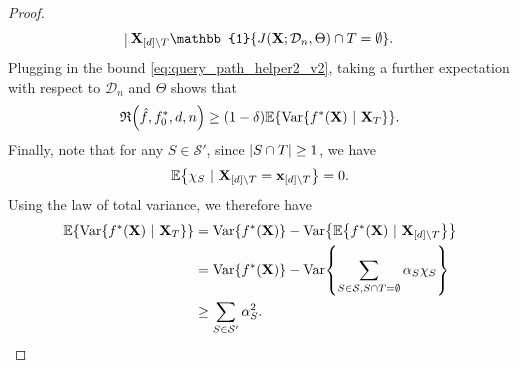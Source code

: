 \documentclass[11pt]{article}
\newcommand{\bx}{\mathbf{x}}
\newcommand{\bX}{\mathbf{X}}
\DeclarePairedDelimiter{\braces}{\lbrace}{\rbrace}
\DeclarePairedDelimiter{\paren}{(}{)}
\DeclarePairedDelimiter{\abs}{|}{|}
\renewcommand{\P}{\mathbb{P}}
\newcommand{\E}{\mathbb{E}}
\newcommand{\indicator}{\mathbb{1}}
\newcommand{\Var}{\operatorname{Var}}
\newcommand{\xmeasure}{\nu}
\newcommand{\nfeats}{d}
\newcommand{\nsamples}{n}
\newcommand{\coordindices}{[\nfeats]}
\newcommand{\data}[1][n]{\mathcal{D}_{#1}}
\newcommand{\suppset}{S^*}
\newcommand{\fna}{\hat{f}_{\operatorname{NA}}}
\newcommand{\monomial}{\chi}
\newcommand{\traversal}{T}
\newcommand{\fcoefs}{\mathcal{S}}
\newcommand{\objective}{\mathfrak{R}}
\begin{document}
\begin{proof}
\begin{equation}
{{            \vline~\bX_{\coordindices\backslash\traversal}}\indicator\braces*{J(\bX;\data,\Theta)\cap \traversal = \emptyset }}.
    \end{equation}
    Plugging in the bound \eqref{eq:query_path_helper2_v2}, taking a further expectation with respect to $\data$ and $\Theta$ shows that
    \begin{equation}
        \objective\paren*{\hat f, f^*_0,\nfeats,\nsamples} \geq (1-\delta)\E\braces*{\Var\braces*{f^*(\bX)~|~\bX_{\traversal}}}.
    \end{equation}
    Finally, note that for any $S \in \fcoefs'$, since $\abs*{S\cap \traversal} \geq 1$, we have 
    \begin{equation}
        \E\braces*{\monomial_S~|~\bX_{\coordindices\backslash\traversal} = \bx_{\coordindices\backslash\traversal}} = 0.
    \end{equation}
    Using the law of total variance, we therefore have
    \begin{equation}
        \begin{split}
            \E\braces*{\Var\braces*{f^*(\bX)~|~\bX_{\traversal}}} & = \Var\braces*{f^*(\bX)} - \Var\braces*{\E\braces*{f^*(\bX)~|~\bX_{\coordindices\backslash\traversal}}} \\
            & = \Var\braces*{f^*(\bX)} - \Var\braces*{\sum_{S \in \fcoefs, S\cap \traversal = \emptyset} \alpha_S\monomial_S} \\
            & \geq \sum_{S \in \fcoefs'} \alpha_S^2. \qedhere
        \end{split}
    \end{equation}

\end{proof}
\end{document}
